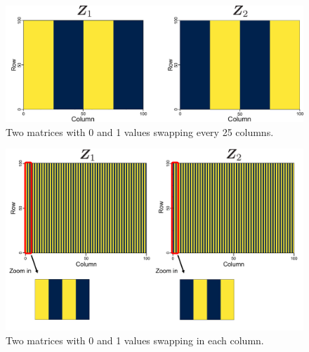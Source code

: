 \begin{figure}[t]
  \begin{center}
      \includegraphics[width=0.95\columnwidth]{figures/origi_spec/25stripe.pdf}
  \end{center}
\caption{Two matrices with 0 and 1 values swapping every 25 columns.}
\label{fig:25stripe_spec}
\end{figure}

\begin{figure}[t]
  \begin{center}
      \includegraphics[width=0.95\columnwidth]{figures/origi_spec/stripe.pdf}
  \end{center}
\caption{Two matrices with 0 and 1 values swapping in each column.}
\label{fig:stripe_spec}
\end{figure}


